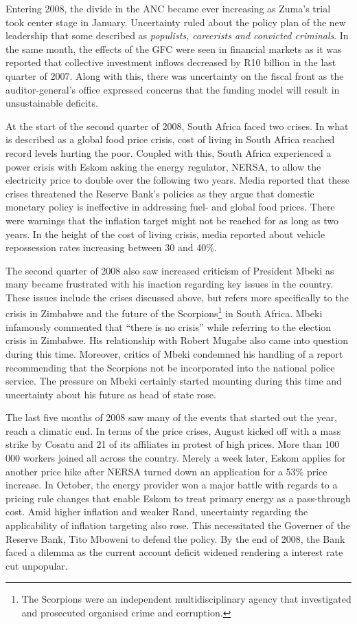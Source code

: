 \documentclass[11pt,preprint, authoryear]{elsarticle}
\numberwithin{equation}{section}
\numberwithin{figure}{section}
\numberwithin{table}{section}
\let\rmarkdownfootnote\footnote%
\def\footnote{\protect\rmarkdownfootnote}
\begin{document}
Entering 2008, the divide in the ANC became ever increasing as Zuma's
trial took center stage in January. Uncertainty ruled about the policy
plan of the new leadership that some described as
\emph{populists, careerists and convicted criminals}. In the same month,
the effects of the GFC were seen in financial markets as it was reported
that collective investment inflows decreased by R10 billion in the last
quarter of 2007. Along with this, there was uncertainty on the fiscal
front as the auditor-general's office expressed concerns that the
funding model will result in unsustainable deficits.

At the start of the second quarter of 2008, South Africa faced two
crises. In what is described as a global food price crisis, cost of
living in South Africa reached record levels hurting the poor. Coupled
with this, South Africa experienced a power crisis with Eskom asking the
energy regulator, NERSA, to allow the electricity price to double over
the following two years. Media reported that these crises threatened the
Reserve Bank's policies as they argue that domestic monetary policy is
ineffective in addressing fuel- and global food prices. There were
warnings that the inflation target might not be reached for as long as
two years. In the height of the cost of living crisis, media reported
about vehicle repossession rates increasing between 30 and 40\%.

The second quarter of 2008 also saw increased criticism of President
Mbeki as many became frustrated with his inaction regarding key issues
in the country. These issues include the crises discussed above, but
refers more specifically to the crisis in Zimbabwe and the future of the
Scorpions\footnote{The Scorpions were an independent multidisciplinary agency that investigated and prosecuted organised crime and corruption.} in South Africa. Mbeki infamously commented that ``there is no
crisis'' while referring to the election crisis in Zimbabwe. His
relationship with Robert Mugabe also came into question during this
time. Moreover, critics of Mbeki condemned his handling of a report
recommending that the Scorpions not be incorporated into the national
police service. The pressure on Mbeki certainly started mounting during
this time and uncertainty about his future as head of state rose.

The last five months of 2008 saw many of the events that started out the
year, reach a climatic end. In terms of the price crises, August kicked
off with a mass strike by Cosatu and 21 of its affiliates in protest of
high prices. More than 100 000 workers joined all across the country.
Merely a week later, Eskom applies for another price hike after NERSA
turned down an application for a 53\% price increase. In October, the
energy provider won a major battle with regards to a pricing rule
changes that enable Eskom to treat primary energy as a pass-through
cost. Amid higher inflation and weaker Rand, uncertainty regarding the
applicability of inflation targeting also rose. This necessitated the
Governer of the Reserve Bank, Tito Mboweni to defend the policy. By the
end of 2008, the Bank faced a dilemma as the current account deficit
widened rendering a interest rate cut unpopular.
\end{document}
